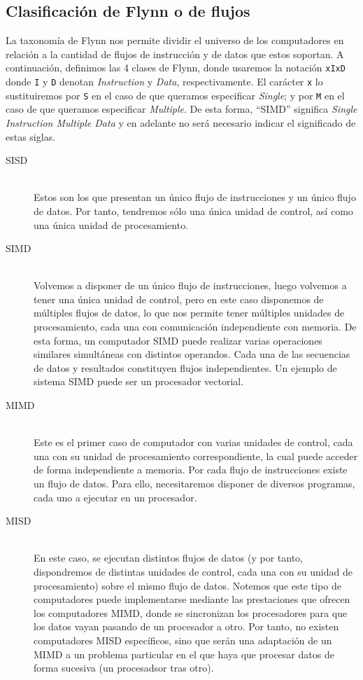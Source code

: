 \subsection{Clasificación de Flynn o de flujos}
La taxonomía de Flynn nos permite dividir el universo de los computadores en relación a la cantidad de flujos de instrucción y de datos que estos soportan. A continuación, definimos las 4 clases de Flynn, donde usaremos la notación \verb|xIxD| donde \verb|I| y \verb|D| denotan \emph{Instruction} y \emph{Data}, respectivamente. El carácter \verb|x| lo sustituiremos por \verb|S| en el caso de que queramos especificar \emph{Single}; y por \verb|M| en el caso de que queramos especificar \emph{Multiple}. De esta forma, ``SIMD'' significa \emph{Single Instruction Multiple Data} y en adelante no será necesario indicar el significado de estas siglas.
\begin{description}
    \item [SISD]~\\
        Estos son los que presentan un único flujo de instrucciones y un único flujo de datos. Por tanto, tendremos sólo una única unidad de control, así como una única unidad de procesamiento. 
    \item [SIMD]~\\
        Volvemos a disponer de un único flujo de instrucciones, luego volvemos a tener una única unidad de control, pero en este caso disponemos de múltiples flujos de datos, lo que nos permite tener múltiples unidades de procesamiento, cada una con comunicación independiente con memoria. De esta forma, un computador SIMD puede realizar varias operaciones similares simultáneas con distintos operandos. Cada una de las secuencias de datos y resultados constituyen flujos independientes. Un ejemplo de sistema SIMD puede ser un procesador vectorial.
    \item [MIMD]~\\
        Este es el primer caso de computador con varias unidades de control, cada una con su unidad de procesamiento correspondiente, la cual puede acceder de forma independiente a memoria. Por cada flujo de instrucciones existe un flujo de datos. Para ello, necesitaremos disponer de diversos programas, cada uno a ejecutar en un procesador.
    \item [MISD]~\\
        En este caso, se ejecutan distintos flujos de datos (y por tanto, dispondremos de distintas unidades de control, cada una con su unidad de procesamiento) sobre el mismo flujo de datos. Notemos que este tipo de computadores puede implementarse mediante las prestaciones que ofrecen los computadores MIMD, donde se sincronizan los procesadores para que los datos vayan pasando de un procesador a otro. Por tanto, no existen computadores MISD específicos, sino que serán una adaptación de un MIMD a un problema particular en el que haya que procesar datos de forma sucesiva (un procesadsor tras otro).
\end{description}

